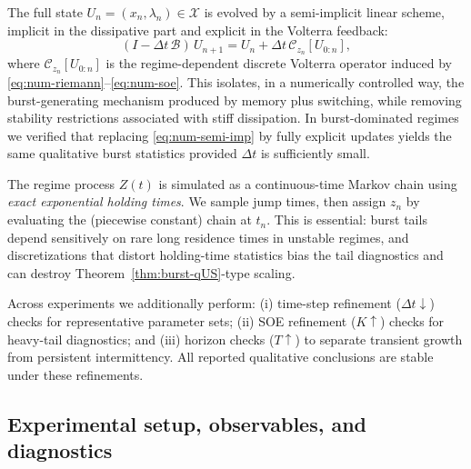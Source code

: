 \documentclass[12pt,a4paper]{article}
\theoremstyle{plain}
\theoremstyle{definition}
\theoremstyle{remark}
\begin{document}
The full state $U_n=(x_n,\lambda_n)\in\mathcal X$ is evolved by a semi-implicit linear scheme, implicit in the dissipative part and
explicit in the Volterra feedback:
\begin{equation}
	(I-\Delta t\,\mathcal B)\,U_{n+1}
	=
	U_n+\Delta t\,\mathcal C_{z_n}[U_{0:n}],
	\label{eq:num-semi-imp}
\end{equation}
where $\mathcal C_{z_n}[U_{0:n}]$ is the regime-dependent discrete Volterra operator induced by
\eqref{eq:num-riemann}--\eqref{eq:num-soe}.
This isolates, in a numerically controlled way, the burst-generating mechanism produced by memory plus switching, while removing
stability restrictions associated with stiff dissipation.
In burst-dominated regimes we verified that replacing \eqref{eq:num-semi-imp} by fully explicit updates yields the same qualitative
burst statistics provided $\Delta t$ is sufficiently small.

The regime process $Z(t)$ is simulated as a continuous-time Markov chain using \emph{exact exponential holding times}.
We sample jump times, then assign $z_n$ by evaluating the (piecewise constant) chain at $t_n$.
This is essential: burst tails depend sensitively on rare long residence times in unstable regimes, and discretizations that distort
holding-time statistics bias the tail diagnostics and can destroy Theorem~\ref{thm:burst-qUS}-type scaling.

Across experiments we additionally perform: (i) time-step refinement ($\Delta t\downarrow$) checks for representative parameter sets;
(ii) SOE refinement ($K\uparrow$) checks for heavy-tail diagnostics; and (iii) horizon checks ($T\uparrow$) to separate transient growth
from persistent intermittency. All reported qualitative conclusions are stable under these refinements.

\subsection{Experimental setup, observables, and diagnostics}
\label{subsec:num-observables}
\end{document}
